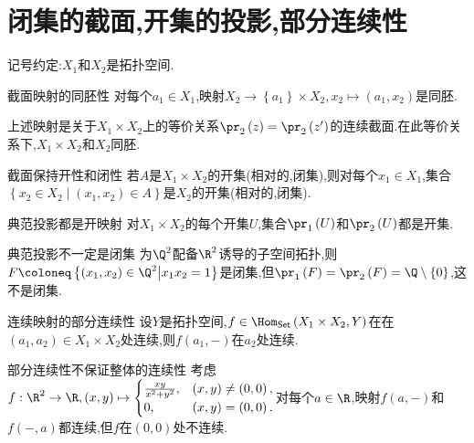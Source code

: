 \section{闭集的截面,开集的投影,部分连续性}

记号约定:$X_{1}$和$X_{2}$是拓扑空间.

\begin{proposition}{截面映射的同胚性}{}
	对每个$a_{1}\in X_{1}$,映射$X_{2}\to\left\{a_{1}\right\}\times X_{2},x_{2}\mapsto\left(a_{1},x_{2}\right)$是同胚.
\end{proposition}

\begin{remark}{}{}
	上述映射是关于$X_{1}\times X_{2}$上的等价关系$\pr_{2}\left(z\right)=\pr_{2}\left(z^{\prime}\right)$的连续截面.在此等价关系下,$X_{1}\times X_{2}$和$X_{2}$同胚.
\end{remark}

\begin{corollary}{截面保持开性和闭性}{}
	若$A$是$X_{1}\times X_{2}$的开集(相对的,闭集),则对每个$x_{1}\in X_{1}$,集合$\left\{x_{2}\in X_{2}\middle|\left(x_{1},x_{2}\right)\in A\right\}$是$X_{2}$的开集(相对的,闭集).
\end{corollary}

\begin{proposition}{典范投影都是开映射}{}
	对$X_{1}\times X_{2}$的每个开集$U$,集合$\pr_{1}\left(U\right)$和$\pr_{2}\left(U\right)$都是开集.
\end{proposition}

\begin{example}{典范投影不一定是闭集}{}
	为$\Q^{2}$配备$\R^{2}$诱导的子空间拓扑,则$F\coloneq\left\{\left(x_{1},x_{2}\right)\in\Q^{2}\middle|x_{1}x_{2}=1\right\}$是闭集,但$\pr_{1}\left(F\right)=\pr_{2}\left(F\right)=\Q\setminus\left\{0\right\}$,这不是闭集.
\end{example}

\begin{proposition}{连续映射的部分连续性}{}
	设$Y$是拓扑空间,$f\in\Hom_{\mathsf{Set}}\left(X_{1}\times X_{2},Y\right)$在在$\left(a_{1},a_{2}\right)\in X_{1}\times X_{2}$处连续,则$f\left(a_{1},-\right)$在$a_{2}$处连续.
\end{proposition}

\begin{example}{部分连续性不保证整体的连续性}{}
	考虑$f:\R^{2}\to\R,\left(x,y\right)\mapsto
	\begin{cases}
		\frac{xy}{x^{2}+y^{2}},&\left(x,y\right)\neq\left(0,0\right),\\
		0,&\left(x,y\right)=\left(0,0\right).
	\end{cases}$对每个$a\in\R$,映射$f\left(a,-\right)$和$f\left(-,a\right)$都连续,但$f$在$\left(0,0\right)$处不连续.
\end{example}

